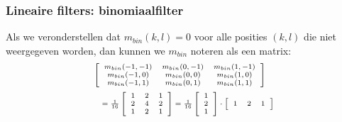 \documentclass[dutch]{beamer}
\theoremstyle{definition}
\theoremstyle{remark}
\theoremstyle{example}
\begin{document}
\frame
{
  \frametitle{Lineaire filters: binomiaalfilter}
  
  Als we veronderstellen dat $m_{bin}(k,l)=0$ voor alle posities
  $(k,l)$ die niet weergegeven worden, dan kunnen we $m_{bin}$ noteren als
  een matrix:
  \begin{displaymath}
  \scriptsize
  \begin{array}{@{}l@{}}
  \left[ \begin{array}{ccc} m_{bin}(-1,-1) & m_{bin}(0,-1) & m_{bin}(1,-1)\\ m_{bin}(-1,0) & m_{bin}(0,0) & m_{bin}(1,0)\\ m_{bin}(-1,1) & m_{bin}(0,1) & m_{bin}(1,1) \end{array} \right] \vspace{5pt}\\
  \quad = \frac{1}{16}\left[ \begin{array}{ccc} 1 & 2 & 1\\ 2 & 4 & 2\\ 1 & 2 & 1 \end{array} \right]
  = \frac{1}{16}\left[ \begin{array}{c} 1\\ 2\\ 1 \end{array} \right] \cdot 
  \left[ \begin{array}{ccc} 1 & 2 & 1 \end{array} \right]
  \end{array}
  \end{displaymath}

}
\end{document}
